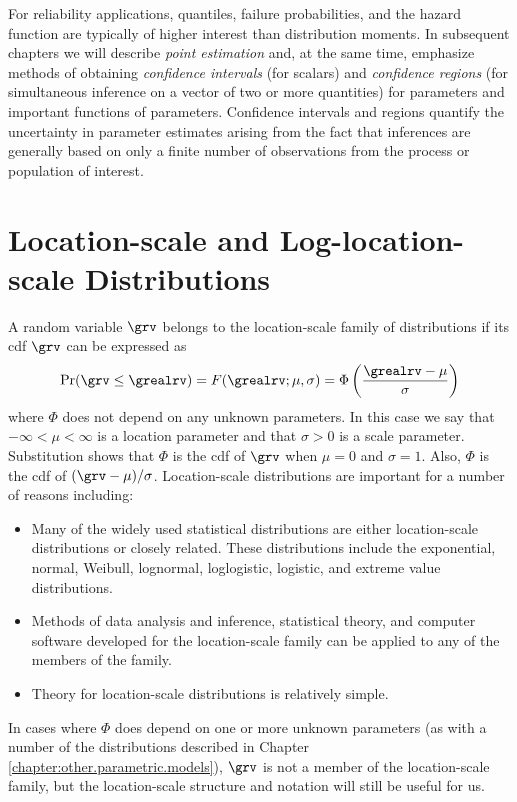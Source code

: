 For reliability applications, quantiles, failure probabilities, and
the hazard function are typically of higher interest than distribution
moments.  In subsequent chapters we will describe {\em point
estimation} and, at the same time, emphasize methods of obtaining {\em
confidence intervals} (for scalars) and {\em confidence regions} (for
simultaneous inference on a vector of two or more quantities) for
parameters and important functions of parameters.  Confidence
intervals and regions quantify the uncertainty in parameter estimates
arising from the fact that inferences are generally based on only a finite
number of observations from the process or population of interest.

\section{Location-scale and Log-location-scale Distributions}
\label{section:location.scale}
A random variable $\grv$ belongs to the location-scale
family of distributions if its cdf $\grv$
can be expressed as
\begin{displaymath}
\Pr(\grv \leq \grealrv) =  
F(\grealrv;\mu,\sigma) = 
	\Phi\left(\frac{\grealrv-\mu}{\sigma}\right)
\end{displaymath}
where $\Phi$ does not depend on any unknown parameters.
In this case
we say that $-\infty < \mu < \infty$ is a location parameter
and that $\sigma> 0 $ is a scale parameter. Substitution shows that
$\Phi$ is the cdf of $\grv$ when $\mu=0$ and $\sigma=1$.
Also, $\Phi$ is the cdf of  $(\grv-\mu)/\sigma$.
Location-scale distributions are important for a number
of reasons including:
\begin{itemize}
\item
Many of the widely used statistical distributions are either
location-scale distributions or closely related.
These distributions include the exponential, normal, Weibull,
lognormal, loglogistic, logistic, and extreme value distributions.
\item
Methods of data analysis and
inference, statistical theory, and computer software
developed for the location-scale family can be applied to any of
the members of the family.
\item
Theory for location-scale distributions is relatively simple.
\end{itemize}
In cases where $\Phi$ does depend on one or more unknown parameters
(as with a number of the distributions described in
Chapter \ref{chapter:other.parametric.models}),
$\grv$ is not a member of the location-scale family, but the
location-scale structure and notation will still be useful for us.

